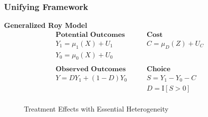 
\begin{frame}
\frametitle{Unifying Framework}

\textbf{Generalized Roy Model}
\begin{align*}
\textbf{Potential Outcomes} &\qquad \textbf{Cost} \\
Y_1 = \mu_1(X) + U_1      &\qquad C = \mu_D(Z) + U_C \\
Y_0 = \mu_0(X) + U_0      &\qquad \\
    & \\
\textbf{Observed Outcomes} &\qquad \textbf{Choice} \\
Y = D Y_1 + (1 - D)Y_0 &\qquad S = Y_1 - Y_0 - C \\
                       &\qquad D = \mathrm{I}[S > 0] \\
\end{align*}

\end{frame}


\begin{frame}
\begin{figure}[htp]\centering
\caption{Treatment Effects with Essential Heterogeneity}\label{Treatment Effects Conventional}
\end{figure}

\end{frame}


